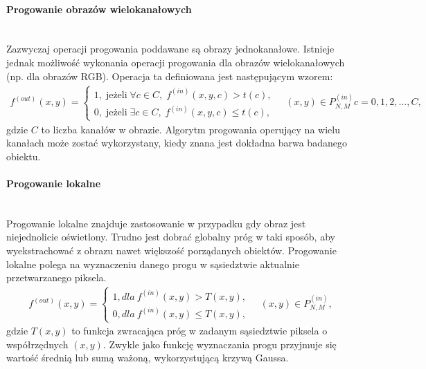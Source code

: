 \paragraph{Progowanie obrazów wielokanałowych}\mbox{}\\
Zazwyczaj operacji progowania poddawane są obrazy jednokanałowe. Istnieje jednak możliwość wykonania operacji progowania dla obrazów wielokanałowych (np. dla obrazów RGB). Operacja ta definiowana jest następującym wzorem:
\begin{gather*}
  f^{(out)}(x, y) = \left\{\begin{matrix}
  1, \; \text{jeżeli} \; \forall c \in C, \; f^{(in)}(x, y, c) > t(c),\\
  0, \; \text{jeżeli} \; \exists c \in C, \; f^{(in)}(x, y, c) \leq t(c),
  \end{matrix}\right. \quad (x, y) \in P^{(in)}_{N,M} c=0,1,2,...,C,
\end{gather*}
gdzie $C$ to liczba kanałów w obrazie.
Algorytm progowania operujący na wielu kanałach może zostać wykorzystany, kiedy znana jest dokładna barwa badanego obiektu.

\paragraph{Progowanie lokalne}\mbox{}\\
Progowanie lokalne znajduje zastosowanie w przypadku gdy obraz jest niejednolicie oświetlony. Trudno jest dobrać globalny próg w taki sposób, aby wyekstrachować z obrazu nawet większość porządanych obiektów. Progowanie lokalne polega na wyznaczeniu danego progu w sąsiedztwie aktualnie przetwarzanego piksela. 
\begin{gather*}
  f^{(out)}(x, y) = \left\{\begin{matrix}
  1, dla \: f^{(in)}(x, y) > T(x, y),\\
  0, dla \: f^{(in)}(x, y) \leq T(x, y),
  \end{matrix}\right. \quad (x, y) \in P^{(in)}_{N,M},
\end{gather*}
gdzie $T(x, y)$ to funkcja zwracająca próg w zadanym sąsiedztwie piksela o współrzędnych $(x, y)$. Zwykle jako funkcję wyznaczania progu przyjmuje się wartość średnią lub sumą ważoną, wykorzystującą krzywą Gaussa.


